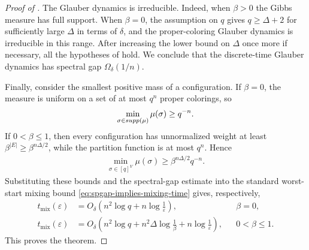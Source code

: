 \documentclass[10pt,a4paper]{amsart}
\newcommand{\abs}[1]{\left\vert#1\right\vert}
\newcommand{\tp}{\tuple}
\newcommand{\tuple}[1]{\left(#1\right)}
\begin{document}
\begin{proof}[Proof of ]
The Glauber dynamics is irreducible.  Indeed, when $\beta>0$ the Gibbs
measure has full support.  When $\beta=0$, the assumption on $q$ gives
$q\geq\Delta+2$ for sufficiently large $\Delta$ in terms of $\delta$,
and the proper-coloring Glauber dynamics is irreducible in this range.
After increasing the lower bound on $\Delta$ once more if necessary,
all the hypotheses of  hold.  We conclude that the
discrete-time Glauber dynamics has spectral gap
$\Omega_\delta(1/n)$.

Finally, consider the smallest positive mass of a configuration.  If
$\beta=0$, the measure is uniform on a set of at most $q^n$ proper
colorings, so
\begin{align*}
  \min_{\sigma\in\-{supp}(\mu)}\mu(\sigma)\geq q^{-n}.
\end{align*}
If $0<\beta\leq1$, then every configuration has unnormalized weight at
least $\beta^{\abs{E}}\geq\beta^{n\Delta/2}$, while the partition
function is at most $q^n$.  Hence
\begin{align*}
  \min_{\sigma\in[q]^V}\mu(\sigma)
  \geq
  \beta^{n\Delta/2}q^{-n}.
\end{align*}
Substituting these bounds and the spectral-gap estimate into the
standard worst-start mixing bound
\eqref{eq:spgap-implies-mixing-time} gives, respectively,
\begin{align*}
  t_{\mathrm{mix}}(\varepsilon)
  &=
  O_\delta\tp{
    n^2\log q+n\log\frac1\varepsilon
  },
  &&\beta=0,
  \\
  t_{\mathrm{mix}}(\varepsilon)
  &=
  O_\delta\tp{
    n^2\log q+n^2\Delta\log\frac1\beta
    +n\log\frac1\varepsilon
  },
  &&0<\beta\leq1.
\end{align*}
This proves the theorem.
\end{proof}
\end{document}
